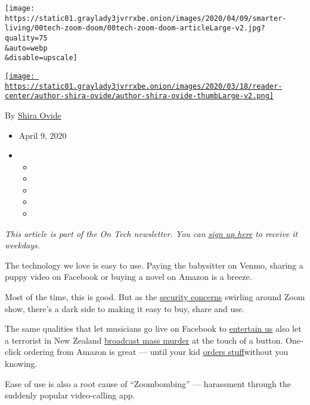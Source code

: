 \texttt{[image: https://static01.graylady3jvrrxbe.onion/images/2020/04/09/smarter-living/00tech-zoom-doom/00tech-zoom-doom-articleLarge-v2.jpg?quality=75\\\&auto=webp\\\&disable=upscale]}

\href{https://www.nytimes3xbfgragh.onion/by/shira-ovide}{\texttt{[image: https://static01.graylady3jvrrxbe.onion/images/2020/03/18/reader-center/author-shira-ovide/author-shira-ovide-thumbLarge-v2.png]}}

By \href{https://www.nytimes3xbfgragh.onion/by/shira-ovide}{Shira Ovide}

\begin{itemize}
\item
  April 9, 2020
\item
  \begin{itemize}
  \item
  \item
  \item
  \item
  \item
  \end{itemize}
\end{itemize}

\emph{This article is part of the On Tech newsletter. You can}
\href{https://www.nytimes3xbfgragh.onion/newsletters/signup/OT}{\emph{sign
up here}} \emph{to receive it weekdays.}

The technology we love is easy to use. Paying the babysitter on Venmo,
sharing a puppy video on Facebook or buying a novel on Amazon is a
breeze.

Most of the time, this is good. But as the
\href{https://www.nytimes3xbfgragh.onion/2020/04/08/business/zoom-video-privacy-security-coronavirus.html}{security
concerns} swirling around Zoom show, there's a dark side to making it
easy to buy, share and use.

The same qualities that let musicians go live on Facebook to
\href{https://www.cnn.com/videos/entertainment/2020/03/24/garth-brooks-trisha-yearwood-facebook-live-concert-coronavirus-mxp-vpx.hln}{entertain
us} also let a terrorist in New Zealand
\href{https://www.nytimes3xbfgragh.onion/2019/03/14/world/asia/christchurch-shooting-new-zealand.html}{broadcast
mass murder} at the touch of a button. One-click ordering from Amazon is
great --- until your kid
\href{https://www.wsj.com/articles/move-over-santa-kids-are-asking-alexa-to-bring-them-presents-11576929600}{orders
stuff}without you knowing.

Ease of use is also a root cause of ``Zoombombing'' --- harassment
through the suddenly popular video-calling app.

